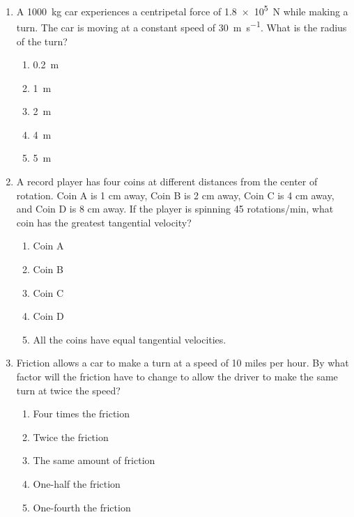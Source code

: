 \documentclass{../../../oss-apphys}
\begin{document}
\genheader


\genmultidirections

\gengravity

\raggedcolumns
\begin{multicols}{2}

  \begin{enumerate}[leftmargin=18pt]

  \item A \SI{1000}{\kilo\gram} car experiences a centripetal force of
    \SI{1.8e5}{\newton} while making a turn. The car is moving at a constant
    speed of \SI{30}{\metre\per\second}. What is the radius of the turn?
    \begin{enumerate}[nosep,leftmargin=18pt,label=(\Alph*)]
    \item\SI{.2}{\metre}
    \item\SI{1}{\metre}
    \item\SI{2}{\metre}
    \item\SI{4}{\metre}
    \item\SI{5}{\metre}
    \end{enumerate}

  \item A record player has four coins at different distances from the center of
    rotation. Coin A is 1 cm away, Coin B is 2 cm away, Coin C is 4 cm away,
    and Coin D is 8 cm away. If the player is spinning 45 rotations/min, what
    coin has the greatest tangential velocity?
    \begin{enumerate}[nosep,leftmargin=18pt,label=(\Alph*)]
    \item Coin A
    \item Coin B
    \item Coin C
    \item Coin D
    \item All the coins have equal tangential velocities.
    \end{enumerate}
    
  \item Friction allows a car to make a turn at a speed of 10 miles per hour. By
    what factor will the friction have to change to allow the driver to make the
    same turn at twice the speed?
    \begin{enumerate}[nosep,leftmargin=18pt,label=(\Alph*)]
    \item Four times the friction
    \item Twice the friction
    \item The same amount of friction
    \item One-half the friction
    \item One-fourth the friction
    \end{enumerate}
    \columnbreak
    

\end{enumerate}
\end{multicols}
\end{document}

